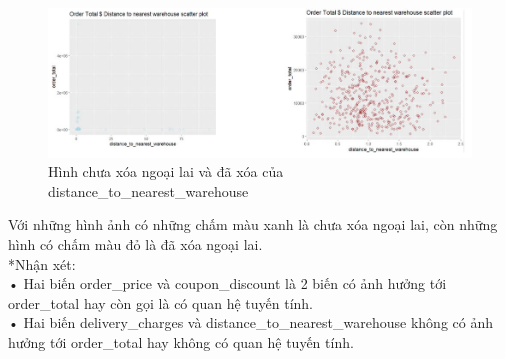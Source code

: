 \begin{figure}[H]
    \centering
    \includegraphics[width=0.8\linewidth]{graphics/bang12.jpg}
    \caption{Hình chưa xóa ngoại lai và đã xóa của distance\_to\_nearest\_warehouse}
 
\end{figure}
Với những hình ảnh có những chấm màu xanh là chưa xóa ngoại lai, còn những hình có chấm màu đỏ là đã xóa ngoại lai. \\
*Nhận xét: \\
•	Hai biến order\_price và coupon\_discount là 2 biến có ảnh hưởng tới order\_total hay còn gọi là có quan hệ tuyến tính.\\
•	Hai biến delivery\_charges và distance\_to\_nearest\_warehouse không có ảnh hưởng tới order\_total hay không có quan hệ tuyến tính.
